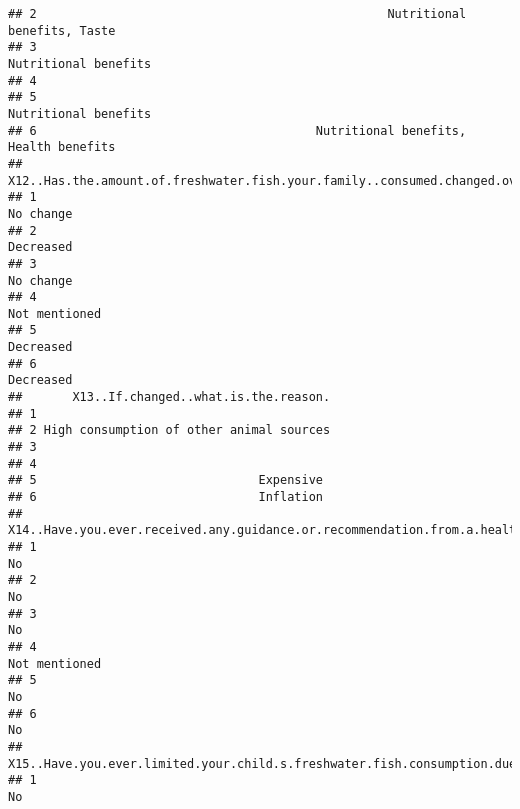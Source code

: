 \documentclass[
]{article}
\begin{document}
\begin{verbatim}
## 2                                                 Nutritional benefits, Taste
## 3                                                        Nutritional benefits
## 4                                                                            
## 5                                                        Nutritional benefits
## 6                                       Nutritional benefits, Health benefits
##   X12..Has.the.amount.of.freshwater.fish.your.family..consumed.changed.over.the.last.3.years.
## 1                                                                                   No change
## 2                                                                                   Decreased
## 3                                                                                   No change
## 4                                                                               Not mentioned
## 5                                                                                   Decreased
## 6                                                                                   Decreased
##       X13..If.changed..what.is.the.reason.
## 1                                         
## 2 High consumption of other animal sources
## 3                                         
## 4                                         
## 5                               Expensive 
## 6                               Inflation 
##   X14..Have.you.ever.received.any.guidance.or.recommendation.from.a.healthcare.professional.regarding.freshwater.fish.consumption.of.your.child.
## 1                                                                                                                                             No
## 2                                                                                                                                             No
## 3                                                                                                                                             No
## 4                                                                                                                                  Not mentioned
## 5                                                                                                                                             No
## 6                                                                                                                                             No
##   X15..Have.you.ever.limited.your.child.s.freshwater.fish.consumption.due.to.any.reason.
## 1                                                                                     No

\end{verbatim}
\end{document}
